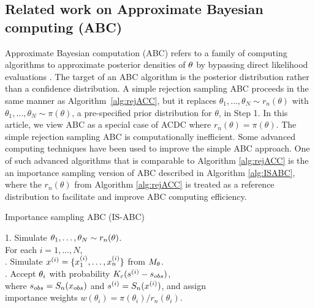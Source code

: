 \subsection{Related work on Approximate Bayesian computing (ABC)}  
Approximate Bayesian computation (ABC)
refers to a family of computing algorithms to approximate posterior densities of ${}{\theta}$ by bypassing direct likelihood evaluations \citep[cf.][]{%
Csillery2010,
Cameron2012,
Peters2012}.
The target of an ABC algorithm is the posterior distribution rather than a confidence distribution. 
A simple rejection sampling ABC proceeds in the same manner as Algorithm~\ref{alg:rejACC}, but it replaces $\theta_1, \ldots, \theta_N \sim r_{n}(\theta)$ with $\theta_1, \ldots, \theta_N \sim  \pi(\theta)$, a pre-specified prior distribution for $\theta$, in Step 1. %
In this article, we view ABC as a special case of ACDC where $r_{n}(\theta) = \pi(\theta)$.
The simple rejection sampling ABC is computationally inefficient. Some advanced computing techniques have been used to improve the simple ABC approach. One of such advanced algorithms that is comparable to Algorithm \ref{alg:rejACC} is the  an importance sampling version of ABC described in
Algorithm \ref{alg:ISABC}, where the $r_{n}(\theta)$ from Algorithm \ref{alg:rejACC} is treated as a reference distribution %
to facilitate and improve ABC computing efficiency.


\noindent
\hrulefill

\vspace{-3mm}
\begin{algorithm}
\caption{Importance sampling ABC (IS-ABC)} \label{alg:ISABC}
	\begin{tabbing}
	 1. Simulate ${}{\theta}_{1},\ldots,{}{\theta}_{N}\sim r_{n}({}{\theta})$. \\
	 For each $i=1,\ldots,N$, \\
	 . Simulate ${}{x}^{(i)}=\{x_{1}^{(i)},\ldots,x_{n}^{(i)}\}$ from $M_{{}{\theta}}$.\\ 
	 . Accept ${}{\theta}_{i}$ with probability $K_{\varepsilon}(s^{(i)}-s_{\relax obs})$,\\ 
	 \quad where $s_{\relax obs}= S_{n}({}{x}_{\relax obs})$ and $ s^{(i)}=S_{n}({}{x}^{(i)})$, and assign \\ \quad importance weights $w(\theta_i)=\pi(\theta_i)/r_{n}(\theta_i)$.
	\end{tabbing}
\end{algorithm}  

